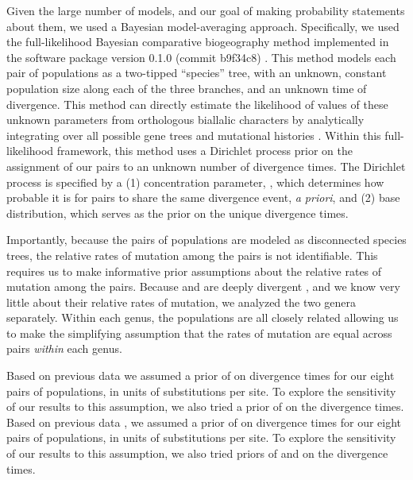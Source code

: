 Given the large number of models, and our goal of making probability statements
about them, we used a Bayesian model-averaging approach.
Specifically, we used the full-likelihood Bayesian comparative biogeography
method implemented in the software package \ecoevolity version 0.1.0 (commit
b9f34c8) \citep{Oaks2018ecoevolity}.
This method models each pair of populations as a two-tipped ``species'' tree,
with an unknown, constant population size along each of the three branches, and
an unknown time of divergence.
This method can directly estimate the likelihood of values of these unknown
parameters from orthologous biallalic characters by analytically integrating
over all possible gene trees and mutational histories \citep{Bryant2012,
    Oaks2018ecoevolity}.
Within this full-likelihood framework, this method uses a Dirichlet process
prior on the assignment of our pairs to an unknown number of divergence times.
The Dirichlet process is specified by a
(1) concentration parameter, \concentration, which determines how probable it
is for pairs to share the same divergence event, \emph{a priori}, and
(2) base distribution, which serves as the prior on the unique divergence
times.

Importantly, because the pairs of populations are modeled as disconnected
species trees, the relative rates of mutation among the pairs is not
identifiable.
This requires us to make informative prior assumptions about the relative rates
of mutation among the pairs.
Because  and  are deeply divergent
\citep[$>$80mya;][]{Gamble2011}, and we know very little about their relative rates of
mutation, we analyzed the two genera separately.
Within each genus, the populations are all closely related \citep{Welton2010,
    Welton2010zootaxa, Siler2010, Siler2012, Siler2014kikuchii} allowing us to
make the simplifying assumption that the rates of mutation are equal across
pairs \emph{within} each genus.

Based on previous data \citep{Welton2010, Welton2010zootaxa, Siler2010} we
assumed a prior of  on divergence times for our eight pairs
of  populations, in units of substitutions per site.
To explore the sensitivity of our results to this assumption, we also
tried a prior of  on the divergence times.
Based on previous data \citep{Siler2012, Siler2014kikuchii}, we assumed a prior
of  on divergence times for our eight pairs of 
populations, in units of substitutions per site.
To explore the sensitivity of our results to this assumption, we also tried
priors of  and  on the 
divergence times.

